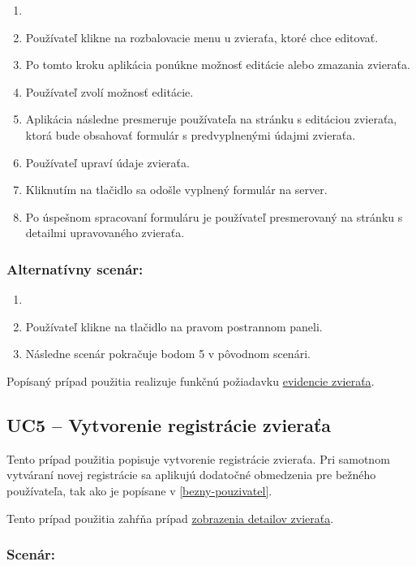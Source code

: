\begin{enumerate}
	\item {}
	\item Používateľ klikne na rozbalovacie menu u zvieraťa, ktoré chce editovať.
	\item Po tomto kroku aplikácia ponúkne možnosť editácie alebo zmazania zvieraťa.
	\item Používateľ zvolí možnosť editácie.
	\item Aplikácia následne presmeruje používateľa na stránku s editáciou zvieraťa, ktorá bude obsahovať formulár s predvyplnenými údajmi zvieraťa.
	\item Používateľ upraví údaje zvieraťa.
	\item Kliknutím na tlačidlo  sa odošle vyplnený formulár na server.
	\item Po úspešnom spracovaní formuláru je používateľ presmerovaný na stránku s detailmi upravovaného zvieraťa.
\end{enumerate}

\subsubsection*{Alternatívny scenár:}

\begin{enumerate}
	\item {}
	\item Používateľ klikne na tlačidlo  na pravom postrannom paneli.
	\item Následne scenár pokračuje bodom 5 v pôvodnom scenári.
\end{enumerate}

Popísaný prípad použitia realizuje funkčnú požiadavku \hyperref[evidencia-zvierat]{evidencie zvieraťa}.

\subsection*{UC5 -- Vytvorenie registrácie zvieraťa}

Tento prípad použitia popisuje vytvorenie registrácie zvieraťa. Pri samotnom vytváraní novej registrácie sa aplikujú dodatočné obmedzenia pre bežného používateľa, tak ako je popísane v \ref{bezny-pouzivatel}.

Tento prípad použitia zahŕňa prípad \hyperref[uc2]{zobrazenia detailov zvieraťa}.

\subsubsection*{Scenár:}

